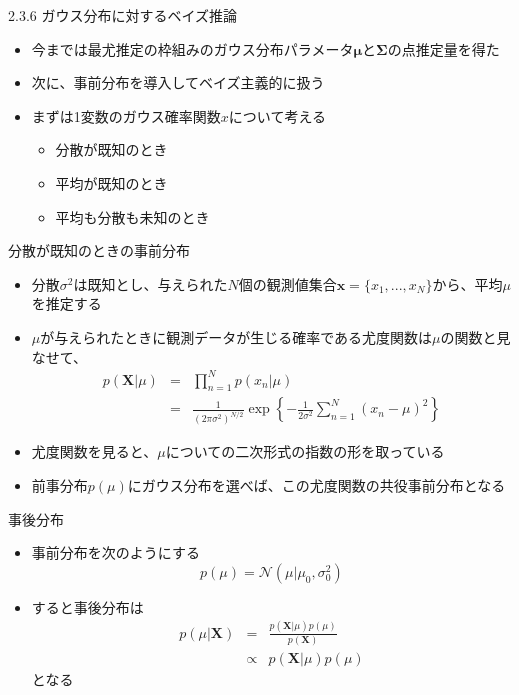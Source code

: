 \begin{frame}{2.3.6 ガウス分布に対するベイズ推論}
 \begin{itemize}
  \item 今までは最尤推定の枠組みのガウス分布パラメータ$\bm{\mu}$と$\bm{\Sigma}$の点推定量を得た
  \item 次に、事前分布を導入してベイズ主義的に扱う
  \item まずは1変数のガウス確率関数$x$について考える
        \begin{itemize}
         \item 分散が既知のとき
         \item 平均が既知のとき
         \item 平均も分散も未知のとき
        \end{itemize}
 \end{itemize}
\end{frame}

\begin{frame}{分散が既知のときの事前分布}
 \begin{itemize}
  \item \alert{分散$\sigma^2$は既知}とし、与えられた$N$個の観測値集合$\bm{x}=\{x_1,...,x_N\}$から、平均$\mu$を推定する
  \item $\mu$が与えられたときに観測データが生じる確率である尤度関数は$\mu$の関数と見なせて、
        \begin{eqnarray*}
         p(\bm{X}|\mu) &= &\prod_{n=1}^{N}p(x_n|\mu) \\
         &=& \frac{1}{(2\pi\sigma^2)^{N/2}}\exp\left\{-\frac{1}{2\sigma^2}\sum_{n=1}^{N}(x_n-\mu)^2\right\}
        \end{eqnarray*}
  \item 尤度関数を見ると、$\mu$についての二次形式の指数の形を取っている
  \item 前事分布$p(\mu)$にガウス分布を選べば、この尤度関数の共役事前分布となる
 \end{itemize}
\end{frame}

\begin{frame}{事後分布}
 \begin{itemize}
  \item 事前分布を次のようにする
        \begin{equation}
         p(\mu) = \mathcal{N}(\mu|\mu_0,\sigma_0^2)
        \end{equation}
  \item すると事後分布は
        \begin{eqnarray}
         p(\mu|\bm{X})&=&\frac{p(\bm{X}|\mu)p(\mu)}{p(\bm{X})} \nonumber \\
         &\propto &p(\bm{X}|\mu)p(\mu)
        \end{eqnarray}
        となる
 \end{itemize}
\end{frame}

